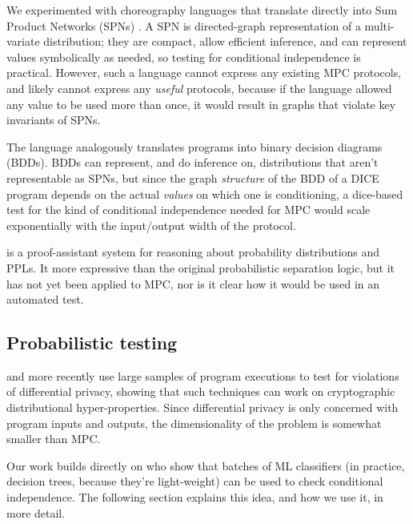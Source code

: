\documentclass[conference]{IEEEtran}
\begin{document}
We experimented with choreography languages that translate directly into Sum Product Networks (SPNs) \cite{TODO}.
A SPN is directed-graph representation of a multi-variate distribution;
they are compact, allow efficient inference, and can represent values symbolically as needed,
so testing for conditional independence is practical.
However, such a language cannot express any existing MPC protocols, and likely cannot express any \textit{useful} protocols,
because if the language allowed any value to be used more than once, it would result in graphs that violate key invariants of SPNs.

The \cite{DICE} language analogously translates programs into binary decision diagrams (BDDs).
BDDs can represent, and do inference on, distributions that aren't representable as SPNs,
but since the graph \textit{structure} of the BDD of a DICE program depends on the actual \textit{values} on which one is conditioning,
a dice-based test for the kind of conditional independence needed for MPC would scale exponentially with the input/output width of the protocol.

\cite{lilac} %
is a proof-assistant system for reasoning about probability distributions and PPLs.
It more expressive than the original probabilistic separation logic,
but it has not yet been applied to MPC, nor is it clear how it would be used in an automated test.

\subsection{Probabilistic testing}

\cite{Kifer} %
and more recently \cite{Zhang et al} %
use large samples of program executions to test for violations of differential privacy,
showing that such techniques can work on cryptographic distributional hyper-properties.
Since differential privacy is only concerned with program inputs and outputs,
the dimensionality of the problem is somewhat smaller than MPC.

Our work builds directly on \cite{decision trees paper} %
who show that batches of ML classifiers (in practice, decision trees, because they're light-weight) can be used to check conditional independence.
The following section explains this idea, and how we use it, in more detail.
\end{document}
